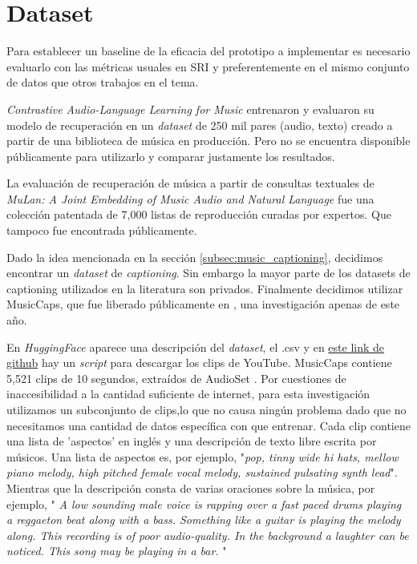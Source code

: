 \section{Dataset}
\label{sec:dataset}

Para establecer un baseline de la eficacia del prototipo a implementar es necesario evaluarlo con las métricas usuales en SRI y preferentemente en el mismo conjunto de datos que otros trabajos en el tema. 

\textit{Contrastive Audio-Language Learning for Music} \cite{Manco2022ContrastiveAL} entrenaron y evaluaron su modelo de recuperación en un \textit{dataset} de 250 mil pares (audio, texto) creado a partir de una biblioteca de música en producción. Pero no se encuentra disponible públicamente para utilizarlo y comparar justamente los resultados.

La evaluación de recuperación de música a partir de consultas textuales de \textit{MuLan: A Joint Embedding of Music Audio and Natural Language} \cite{Huang2022MuLanAJ} fue una colección patentada de 7,000 listas de reproducción curadas por expertos. Que tampoco fue encontrada públicamente.

Dado la idea mencionada en la sección \ref{subsec:music_captioning}, decidimos encontrar un \textit{dataset} de \textit{captioning}. Sin embargo la mayor parte de los datasets de captioning utilizados en la literatura son privados. Finalmente decidimos utilizar MusicCaps, que fue liberado públicamente en \cite{Agostinelli2023MusicLMGM}, una investigación apenas de este año. 

En \textit{HuggingFace} \cite{huggFaceMusicCaps} aparece una descripción del \textit{dataset}, el .csv y en \href{https://github.com/nateraw/download-musiccaps-datase}{este link de github} hay un \textit{script} para descargar los clips de YouTube. MusicCaps contiene 5,521 clips de 10 segundos, extraídos de AudioSet \cite{Gemmeke2017AudioSA}. Por cuestiones de inaccesibilidad a la cantidad suficiente de internet, para esta investigación utilizamos un subconjunto de clips,lo que no causa ningún problema dado que no necesitamos una cantidad de datos específica con que entrenar. Cada clip contiene una lista de 'aspectos' en inglés y una descripción de texto libre escrita por músicos. Una lista de aspectos es, por ejemplo, "\textit{pop, tinny wide hi hats, mellow piano melody, high pitched female vocal melody, sustained pulsating synth lead}". Mientras que la descripción consta de varias oraciones sobre la música, por ejemplo, 
" \textit{A low sounding male voice is rapping over a fast paced drums playing a reggaeton beat along with a bass. Something like a guitar is playing the melody along. This recording is of poor audio-quality. In the background a laughter can be noticed. This song may be playing in a bar.} "

